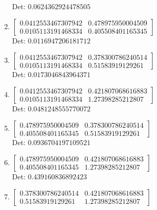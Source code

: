 \documentclass[12pt]{article}
\begin{document}
\begin{enumerate}
Det: $0.0624362924478505$\\

\item $\displaystyle \left[\begin{matrix}0.0412553467307942 & 0.478975950004509\\0.0105113191468334 & 0.405508401165345\end{matrix}\right]$\\

Det: $0.0116947206181712$\\

\item $\displaystyle \left[\begin{matrix}0.0412553467307942 & 0.378300786240514\\0.0105113191468334 & 0.51583919129261\end{matrix}\right]$\\

Det: $0.0173046843964371$\\

\item $\displaystyle \left[\begin{matrix}0.0412553467307942 & 0.421807068616883\\0.0105113191468334 & 1.27398285212807\end{matrix}\right]$\\

Det: $0.0481248555770072$\\

\item $\displaystyle \left[\begin{matrix}0.478975950004509 & 0.378300786240514\\0.405508401165345 & 0.51583919129261\end{matrix}\right]$\\

Det: $0.0936704197109521$\\

\item $\displaystyle \left[\begin{matrix}0.478975950004509 & 0.421807068616883\\0.405508401165345 & 1.27398285212807\end{matrix}\right]$\\

Det: $0.439160836892423$\\

\item $\displaystyle \left[\begin{matrix}0.378300786240514 & 0.421807068616883\\0.51583919129261 & 1.27398285212807\end{matrix}\right]$\\


\end{enumerate}
\end{document}
